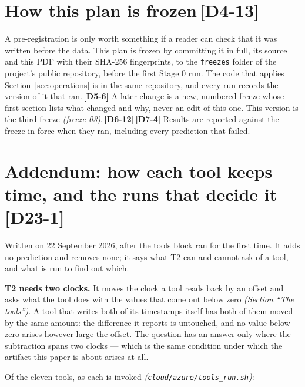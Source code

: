 \documentclass[11pt]{article}
\newcommand{\gl}[1]{{\color{soft}\itshape\small (#1)}}
\newcommand{\chgold}[1]{\,{\color{oldcol}\bfseries\footnotesize[#1]}}
\begin{document}
\section[How this plan is frozen]{How this plan is frozen\protect\chgold{D4-13}}\label{sec:freeze}
A pre-registration is only worth something if a reader can check that it was written before the data. This plan is frozen by committing it in full, its source and this PDF with their SHA-256 fingerprints, to the \texttt{freezes} folder of the project's public repository, before the first Stage 0 run. The code that applies Section~\ref{sec:operations} is in the same repository, and every run records the version of it that ran.\chgold{D5-6} A later change is a new, numbered freeze whose first section lists what changed and why, never an edit of this one. This version is the third freeze \gl{freeze 03}.\chgold{D6-12}\chgold{D7-4} Results are reported against the freeze in force when they ran, including every prediction that failed.

\section[Addendum: how each tool keeps time]{Addendum: how each tool keeps time, and the runs that decide it\protect\chgold{D23-1}}\label{sec:addendum}
Written on 22 September 2026, after the tools block ran for the first time. It adds no prediction
and removes none; it says what T2 can and cannot ask of a tool, and what is run to find out which.

\textbf{T2 needs two clocks.} It moves the clock a tool reads back by an offset and asks what the
tool does with the values that come out below zero \gl{Section ``The tools''}. A tool that writes
both of its timestamps itself has both of them moved by the same amount: the difference it reports
is untouched, and no value below zero arises however large the offset. The question has an answer
only where the subtraction spans two clocks --- which is the same condition under which the
artifact this paper is about arises at all.

Of the eleven tools, as each is invoked \gl{\texttt{cloud/azure/tools\_run.sh}}:
\end{document}
